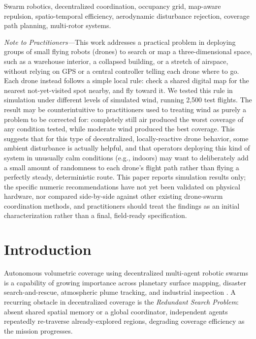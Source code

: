 \documentclass[10pt,journal]{IEEEtran}
\begin{document}
\begin{IEEEkeywords}
Swarm robotics, decentralized coordination, occupancy grid, map-aware
repulsion, spatio-temporal efficiency, aerodynamic disturbance rejection,
coverage path planning, multi-rotor systems.
\end{IEEEkeywords}

\noindent\textit{Note to Practitioners---}This work addresses a practical
problem in deploying groups of small flying robots (drones) to search or map
a three-dimensional space, such as a warehouse interior, a collapsed
building, or a stretch of airspace, without relying on GPS or a central
controller telling each drone where to go. Each drone instead follows a
simple local rule: check a shared digital map for the nearest not-yet-visited
spot nearby, and fly toward it. We tested this rule in simulation under
different levels of simulated wind, running 2,500 test flights. The result
may be counterintuitive to practitioners used to treating wind as purely a
problem to be corrected for: completely still air produced the worst
coverage of any condition tested, while moderate wind produced the best
coverage. This suggests that for this type of decentralized, locally-reactive
drone behavior, some ambient disturbance is actually helpful, and that
operators deploying this kind of system in unusually calm conditions (e.g.,
indoors) may want to deliberately add a small amount of randomness to each
drone's flight path rather than flying a perfectly steady, deterministic
route. This paper reports simulation results only; the specific numeric
recommendations have not yet been validated on physical hardware, nor
compared side-by-side against other existing drone-swarm coordination
methods, and practitioners should treat the findings as an initial
characterization rather than a final, field-ready specification.

\section{Introduction}
\label{sec:intro}

Autonomous volumetric coverage using decentralized multi-agent robotic
swarms is a capability of growing importance across planetary surface
mapping, disaster search-and-rescue, atmospheric plume tracking, and
industrial inspection \cite{latombe1991, brambilla2013review}. A recurring
obstacle in decentralized coverage is the \textit{Redundant Search
Problem}: absent shared spatial memory or a global coordinator, independent
agents repeatedly re-traverse already-explored regions, degrading coverage
efficiency as the mission progresses.
\end{document}
